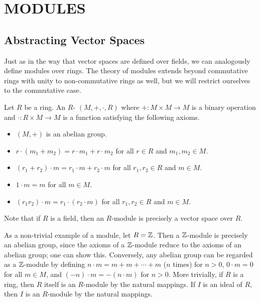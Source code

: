 \chapter{MODULES}

\section{Abstracting Vector Spaces}

Just as in the way that vector spaces are defined over fields, we can analogously define modules over rings. The theory of modules extends beyond commutative rings with unity to non-commutative rings as well, but we will restrict ourselves to the commutative case.

\begin{definition}
    Let $R$ be a ring. An $R$- $(M,+,\cdot,R)$ where $+ : M \times M \to M$ is a binary operation and $\cdot : R \times M \to M$ is a function satisfying the following axioms.
    \begin{itemize}
        \item $(M,+)$ is an abelian group.
        \item $r \cdot (m_{1} + m_{2}) = r \cdot m_{1} + r \cdot m_{2}$ for all $r \in R$ and $m_{1},m_{2} \in M$.
        \item $(r_{1} + r_{2}) \cdot m = r_{1} \cdot m + r_{2} \cdot m$ for all $r_{1},r_{2} \in R$ and $m \in M$.
        \item $1 \cdot m = m$ for all $m \in M$.
        \item $(r_{1}r_{2}) \cdot m = r_{1} \cdot (r_{2} \cdot m)$ for all $r_{1},r_{2} \in R$ and $m \in M$.
    \end{itemize}
\end{definition}

Note that if $R$ is a field, then an $R$-module is precisely a vector space over $R$.

\begin{example}
    As a non-trivial example of a module, let $R = \mathbb{Z}$. Then a $\mathbb{Z}$-module is precisely an abelian group, since the axioms of a $\mathbb{Z}$-module reduce to the axioms of an abelian group; one can show this. Conversely, any abelian group can be regarded as a $\mathbb{Z}$-module by defining $n \cdot m = m + m + \cdots + m$ ($n$ times) for $n > 0$, $0 \cdot m = 0$ for all $m \in M$, and $(-n) \cdot m = -(n \cdot m)$ for $n > 0$. More trivially, if $R$ is a ring, then $R$ itself is an $R$-module by the natural mappings. If $I$ is an ideal of $R$, then $I$ is an $R$-module by the natural mappings.
\end{example}


